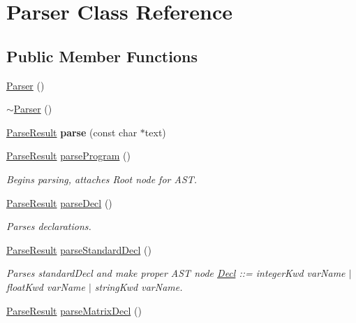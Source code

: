 \hypertarget{classParser}{\section{Parser Class Reference}
\label{classParser}
}
\subsection*{Public Member Functions}
\begin{DoxyCompactItemize}
\item 
\hyperlink{classParser_a12234f6cd36b61af4b50c94a179422c1}{Parser} ()
\item 
\hyperlink{classParser_a3e658b5917a93a3ef648050d060e3a93}{$\sim$\-Parser} ()
\item 
\hypertarget{classParser_a2c1a7aa0b09a43bc1eef460817efb1d6}{\hyperlink{classParseResult}{Parse\-Result} {\bfseries parse} (const char $\ast$text)}\label{classParser_a2c1a7aa0b09a43bc1eef460817efb1d6}

\item 
\hypertarget{classParser_a14e25c84322809e2f060dc530362ea71}{\hyperlink{classParseResult}{Parse\-Result} \hyperlink{classParser_a14e25c84322809e2f060dc530362ea71}{parse\-Program} ()}\label{classParser_a14e25c84322809e2f060dc530362ea71}

\begin{DoxyCompactList}\small\item\em Begins parsing, attaches Root node for A\-S\-T. \end{DoxyCompactList}\item 
\hypertarget{classParser_ac646227983887c1cd13dae67fa1bc142}{\hyperlink{classParseResult}{Parse\-Result} \hyperlink{classParser_ac646227983887c1cd13dae67fa1bc142}{parse\-Decl} ()}\label{classParser_ac646227983887c1cd13dae67fa1bc142}

\begin{DoxyCompactList}\small\item\em Parses declarations. \end{DoxyCompactList}\item 
\hypertarget{classParser_a1e1f83c0f4b11148a356d951f191425e}{\hyperlink{classParseResult}{Parse\-Result} \hyperlink{classParser_a1e1f83c0f4b11148a356d951f191425e}{parse\-Standard\-Decl} ()}\label{classParser_a1e1f83c0f4b11148a356d951f191425e}

\begin{DoxyCompactList}\small\item\em Parses standard\-Decl and make proper A\-S\-T node \hyperlink{classDecl}{Decl} \-:\-:= integer\-Kwd var\-Name $\vert$ float\-Kwd var\-Name $\vert$ string\-Kwd var\-Name. \end{DoxyCompactList}\item 
\hypertarget{classParser_a3a00df25fda2af308b69f05eed14ac69}{\hyperlink{classParseResult}{Parse\-Result} \hyperlink{classParser_a3a00df25fda2af308b69f05eed14ac69}{parse\-Matrix\-Decl} ()}\label{classParser_a3a00df25fda2af308b69f05eed14ac69}


\end{DoxyCompactItemize}
